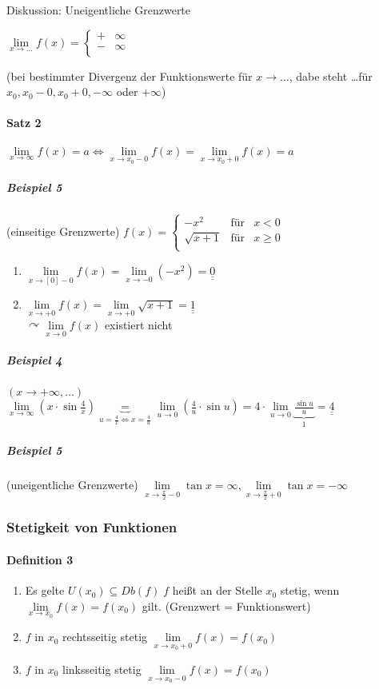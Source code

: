 \documentclass[a4paper]{scrartcl}
\begin{document}
Diskussion: Uneigentliche Grenzwerte

$\lim\limits_{x \to \dots} f(x) = \left\{ \begin{array}{rl} + & \infty \\ - & \infty\\ \end{array}\right.$

(bei bestimmter Divergenz der Funktionswerte für $x \to \dots$, dabe steht \dots für $x_0 , x_0 -0, x_0 + 0, - \infty$ oder $+ \infty$)

\paragraph{Satz 2}
$\lim\limits_{x \to \infty} f(x) = a \Leftrightarrow \lim\limits_{x \to x_0 -0} f(x) = \lim\limits_{x \to x_0 + 0} f(x) = a$

\subparagraph{Beispiel 5} (einseitige Grenzwerte)
$f(x) = \left\{ \begin{array}{rcl} -x^2 & \mbox{für} & x <0\\
\sqrt{x+1} & \mbox{für} & x \geq 0\\ \end{array}\right.$
\begin{enumerate}
\item $\lim\limits_{x \to [0] - 0} f(x) = \lim\limits_{x \to -0} (-x^2) = \underline{\underline{0}}$
\item $\lim\limits_{x \to +0} f(x) = \lim\limits_{x \to +0} \sqrt{x+1} = \underline{\underline{1}}$\\
$\curvearrowright \lim\limits_{x \to 0} f(x)$ existiert nicht
\end{enumerate}

\subparagraph{Beispiel 4} $(x \to + \infty, \dots)$
$\lim\limits_{x \to \infty} (x \cdot \sin{\frac{4}{x}} ) \underbrace{=}_{u = \frac{4}{x} \Leftrightarrow x = \frac{4}{u}} \lim\limits_{u \to 0} (\frac{4}{u} \cdot \sin{u}) = 4 \cdot \lim\limits_{u \to 0} \underbrace{\frac{\sin{u}}{u}}_{1} = \underline{\underline{4}}$

\subparagraph{Beispiel 5} (uneigentliche Grenzwerte)
$\lim\limits_{x \to \frac{\pi}{2} - 0} \tan{x} = \infty, \lim\limits_{x \to \frac{\pi}{2} + 0} \tan{x} = - \infty$

\subsubsection{Stetigkeit von Funktionen}
\paragraph{Definition 3}
\begin{enumerate}
\item Es gelte $U(x_0) \subseteq Db(f) \; f$ heißt an der Stelle $x_0$ stetig, wenn $\lim\limits_{x \to x_0} f(x) = f(x_0)$ gilt. (Grenzwert = Funktionswert)
\item $f$ in $x_0$ rechtsseitig stetig $\lim\limits_{x \to x_0 + 0} f(x) = f(x_0)$
\item $f$ in $x_0$ linksseitig stetig $\lim\limits_{x \to x_0 -0} f(x) = f(x_0)$
\end{enumerate}
\end{document}
